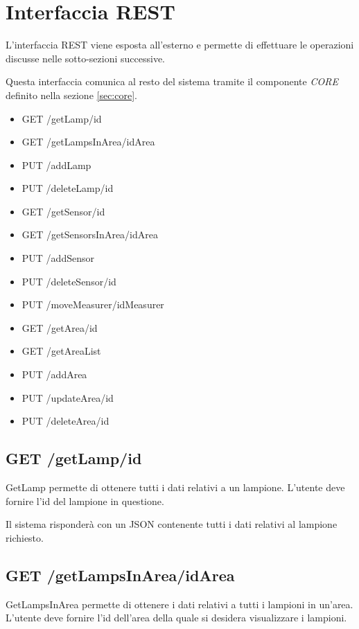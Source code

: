 \section{Interfaccia REST}

L'interfaccia REST viene esposta all'esterno e permette di effettuare le operazioni discusse nelle sotto-sezioni successive.

Questa interfaccia comunica al resto del sistema tramite il componente \textit{CORE} definito nella sezione \ref{sec:core}.

\begin{itemize}
    \item GET /getLamp/id
    \item GET /getLampsInArea/idArea
    \item PUT /addLamp
    \item PUT /deleteLamp/id
    \item GET /getSensor/id
    \item GET /getSensorsInArea/idArea
    \item PUT /addSensor
    \item PUT /deleteSensor/id
    \item PUT /moveMeasurer/idMeasurer
    \item GET /getArea/id
    \item GET /getAreaList
    \item PUT /addArea
    \item PUT /updateArea/id
    \item PUT /deleteArea/id
\end{itemize}

\subsection{ GET /getLamp/id}

GetLamp permette di ottenere tutti i dati relativi a un lampione. L'utente deve fornire l'id del lampione in questione.

Il sistema risponderà con un JSON contenente tutti i dati relativi al lampione richiesto.

\subsection{ GET /getLampsInArea/idArea}

GetLampsInArea permette di ottenere i dati relativi a tutti i lampioni in un'area. L'utente deve fornire l'id dell'area della quale si desidera visualizzare i lampioni.

